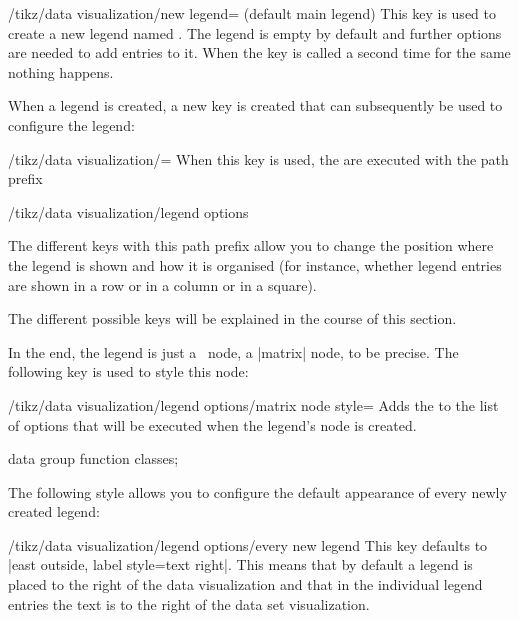 \begin{key}{/tikz/data visualization/new legend=
    (default main legend)}
  This key is used to create a new legend named . The
  legend is empty by default and further options are needed to add
  entries to it. When the key is called a second time for the same
   nothing happens.

  When a legend is created, a new key is created that can
  subsequently be used to configure the legend:
  \begin{key}{/tikz/data visualization/=}
    When this key is used, the  are executed with the
    path prefix
\begin{codeexample}
/tikz/data visualization/legend options
\end{codeexample}
    The different keys with this path prefix allow you to change the
    position where the legend is shown and how it is organised (for
    instance, whether legend entries are shown in a row or in a column
    or in a square).

    The different possible keys will be explained in the course of
    this section.
  \end{key}
  
  In the end, the legend is just a \tikzname\ node, a |matrix| node,
  to be precise. The following key is used to style this node:
  
  
  \begin{key}{/tikz/data visualization/legend options/matrix node style=}
    Adds the  to the list of options that will be
    executed when the legend's node is created.
\begin{codeexample}[width=8cm]
\tikz \datavisualization [
  scientific axes,
  visualize as smooth line/.list=
    {log, lin, squared, exp},
  legend={matrix node style={fill=black!25}},
  log=    {label in legend={text=$\log x$}},
  lin=    {label in legend={text=$x/2$}},
  squared={label in legend={text=$x^2$}},
  exp=    {label in legend={text=$e^x$}},
  style sheet=vary dashing]
data group {function classes};
\end{codeexample}      
  \end{key}

  
  The following style allows you to configure the default appearance
  of every newly created legend:
  \begin{stylekey}{/tikz/data visualization/legend options/every new legend}
    This key defaults to |east outside, label style=text right|. This means
    that by default a legend is placed to the right of the data
    visualization and that in the individual legend entries the text
    is to the right of the data set visualization. 
  \end{stylekey}


\end{key}
